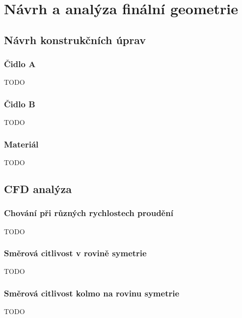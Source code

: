 \section{Návrh a analýza finální geometrie} \label{sec:finalni-geometrie}
    \subsection{Návrh konstrukčních úprav}
        \subsubsection{Čidlo A}
            TODO
        \subsubsection{Čidlo B}
            TODO
        \subsubsection{Materiál}
            TODO
            
    \subsection{CFD analýza}
        \subsubsection{Chování při různých rychlostech proudění}
            TODO
        \subsubsection{Směrová citlivost v rovině symetrie}
            TODO
        \subsubsection{Směrová citlivost kolmo na rovinu symetrie}
            TODO
        
        
